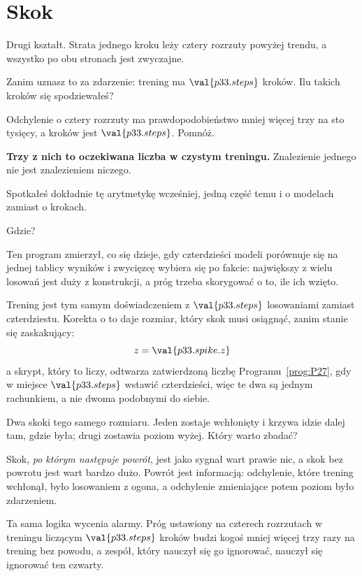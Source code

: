 \section{Skok}
\label{sec:P33-spike}

\begin{fr}
Drugi kształt. Strata jednego kroku leży cztery rozrzuty powyżej trendu, a
wszystko po obu stronach jest zwyczajne.

Zanim uznasz to za zdarzenie: trening ma $\val{p33.steps}$ kroków. Ilu takich
kroków się spodziewałeś?
\dotline
\nextframe
\end{fr}

\begin{fr}
Odchylenie o cztery rozrzuty ma prawdopodobieństwo mniej więcej trzy na sto
tysięcy, a kroków jest $\val{p33.steps}$. Pomnóż.

\textbf{Trzy z nich to oczekiwana liczba w czystym treningu.} Znalezienie
jednego nie jest znalezieniem niczego.
\end{fr}

\begin{fr}
Spotkałeś dokładnie tę arytmetykę wcześniej, jedną część temu i o modelach
zamiast o krokach.

Gdzie?
\dotline
\nextframe
\end{fr}

\begin{fr}
Ten program zmierzył, co się dzieje, gdy czterdzieści modeli porównuje się na
jednej tablicy wyników i zwycięzcę wybiera się po fakcie: największy z wielu
losowań jest duży z konstrukcji, a próg trzeba skorygować o to, ile ich
wzięto.

Trening jest tym samym doświadczeniem z $\val{p33.steps}$ losowaniami zamiast
czterdziestu. Korekta o to daje rozmiar, który skok musi osiągnąć, zanim
stanie się zaskakujący:
\[ z = \val{p33.spike.z} \]
a skrypt, który to liczy, odtwarza zatwierdzoną liczbę
Programu~\ref{prog:P27}, gdy w miejsce $\val{p33.steps}$ wstawić czterdzieści,
więc te dwa są jednym rachunkiem, a nie dwoma podobnymi do siebie.

Dwa skoki tego samego rozmiaru. Jeden zostaje wchłonięty i krzywa idzie dalej
tam, gdzie była; drugi zostawia poziom wyżej. Który warto zbadać?
\dotline
\nextframe
\end{fr}

\begin{fr}
\begin{aibox}
Skok, \emph{po którym następuje powrót}, jest jako sygnał wart prawie nic, a
skok bez powrotu jest wart bardzo dużo. Powrót jest informacją: odchylenie,
które trening wchłonął, było losowaniem z ogona, a odchylenie zmieniające
potem poziom było zdarzeniem.

Ta sama logika wycenia alarmy. Próg ustawiony na czterech rozrzutach w
treningu liczącym $\val{p33.steps}$ kroków budzi kogoś mniej więcej trzy razy
na trening bez powodu, a zespół, który nauczył się go ignorować, nauczył się
ignorować ten czwarty.
\end{aibox}
\end{fr}

